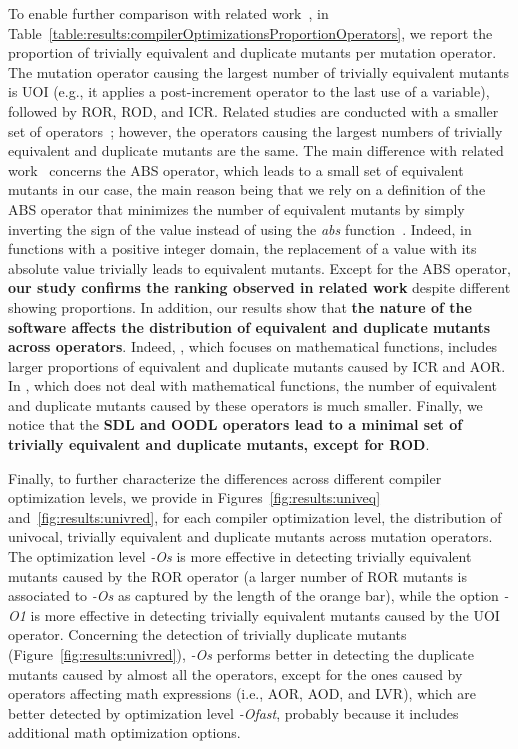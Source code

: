 To enable further comparison with related work~\cite{kintis2017detecting},
in Table~\ref{table:results:compilerOptimizationsProportionOperators}, we report the proportion of trivially equivalent and  duplicate mutants per mutation operator. The mutation operator causing the largest number of trivially equivalent mutants is UOI (e.g., 
it applies a post-increment operator to the last use of a variable),
followed by ROR, 
ROD, 
and ICR. 
Related studies are conducted with a smaller set of operators~\cite{kintis2017detecting}; however, the operators causing the largest numbers of trivially equivalent and duplicate mutants are the same. The main difference with related work~\cite{kintis2017detecting} concerns the ABS operator, which leads to a small set of equivalent mutants in our case, the main reason being that we rely on a definition of the ABS operator that minimizes the number of equivalent mutants by simply inverting the sign of the value instead of using the \emph{abs} function~\cite{Kintis2018}. Indeed, in functions with a positive integer domain, the replacement of a value with its absolute value trivially leads to equivalent mutants. Except for the ABS operator, \textbf{our study confirms the ranking observed in related work} despite different showing proportions. In addition, our results show that \textbf{the nature of the software affects the distribution of equivalent and duplicate mutants across operators}. Indeed, \MLFS{}{}, which focuses on mathematical functions, includes larger proportions of equivalent and duplicate mutants caused by ICR and AOR. In \PARAM{}, which does not deal with mathematical functions, the number of equivalent and duplicate mutants caused by these operators is much smaller. Finally, we notice that the \textbf{SDL and OODL operators lead to a minimal set of trivially equivalent and duplicate mutants, except for ROD}.



Finally, to further characterize  the differences across different compiler optimization levels, we provide in Figures~\ref{fig:results:univeq} and~\ref{fig:results:univred}, for each compiler optimization level, the distribution of univocal, trivially equivalent and duplicate mutants across mutation operators. The optimization level \emph{-Os} is more effective in detecting trivially equivalent mutants caused by the ROR operator (a larger number of ROR mutants is associated to \emph{-Os} as captured by the length of the orange bar), while the option \emph{-O1} is more effective in detecting trivially equivalent mutants caused by the UOI operator. Concerning the detection of trivially duplicate mutants (Figure~\ref{fig:results:univred}), \emph{-Os} performs better in detecting the duplicate mutants caused by almost all the operators, except for the ones caused by operators affecting math expressions (i.e., AOR, AOD, and LVR), which are better detected by optimization level \emph{-Ofast}, probably because it includes additional math optimization options.

